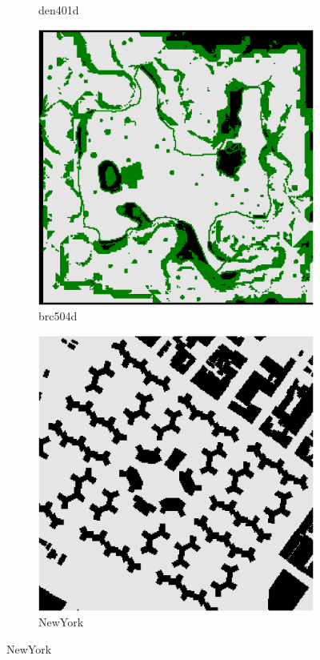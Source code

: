 \documentclass{beamer}
\begin{document}
\begin{frame}
\begin{figure}
\begin{subfigure}[b]{0.24\textwidth}
                \caption{den401d}
            \end{subfigure}
            \hfill
            \begin{subfigure}[b]{0.24\textwidth}
                \centering
                \includegraphics[width=\textwidth]{../maps/brc504d}
                \caption{brc504d}
            \end{subfigure}
            \begin{subfigure}[b]{0.24\textwidth}
                \centering
                \includegraphics[width=\textwidth]{../maps/NewYork_1_256}
                \caption{NewYork}
            \end{subfigure}
            \label{fig:maps}
        \end{figure}
    \end{frame}
\end{document}
